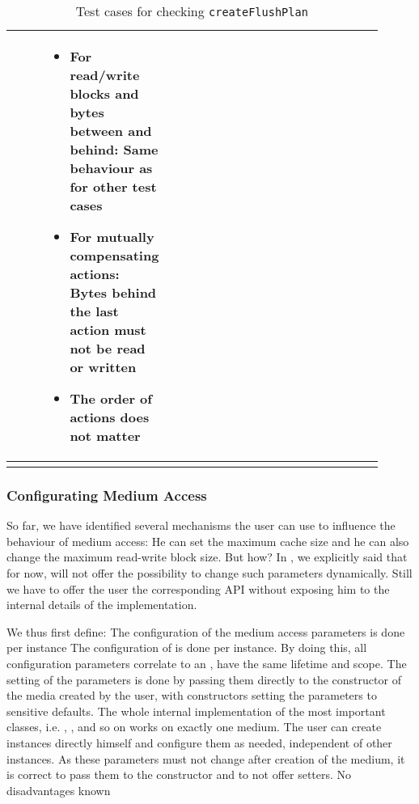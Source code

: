 \begin{landscape}
\begin{longtable}{|p{0.03\linewidth}|p{0.08\linewidth}|p{0.45\linewidth}|p{0.35\linewidth}|}
\begin{enumerate}
\end{enumerate}
&
\begin{itemize}
\item For read/write blocks and bytes between and behind: Same behaviour as for other test cases
\item For mutually compensating actions: Bytes behind the last action must not be read or written
\item The order of actions does not matter
\end{itemize}\\
\hline
\caption{Test cases for checking \texttt{createFlushPlan}}
\label{tab:createFlushPlan}
\end{longtable}
\end{landscape}

\subsubsection{Configurating Medium Access}%
\label{sec:Konfigurationsparameter}%

So far, we have identified several mechanisms the user can use to influence the behaviour of medium access: He can set the maximum cache size and he can also change the maximum read-write block size. But how? In , we explicitly said that for now, \LibName{} will not offer the possibility to change such parameters dynamically. Still we have to offer the user the corresponding API without exposing him to the internal details of the implementation.

We thus first define:
{%
The configuration of the medium access parameters is done per \IMedium{} instance
}
{%
The configuration of \COMPmedia{} is done per \IMedium{} instance. By doing this, all configuration parameters correlate to an \IMedium{}, have the same lifetime and scope. The setting of the parameters is done by passing them directly to the constructor of the media created by the user, with constructors setting the parameters to sensitive defaults.
}
{%
The whole internal implementation of the most important classes, i.e. \IMediumStore{}, \IMediumAccessor{}, \MediumCache{} and so on works on exactly one medium. The user can create \IMedium{} instances directly himself and configure them as needed, independent of other \IMedium{} instances. As these parameters must not change after creation of the medium, it is correct to pass them to the constructor and to not offer setters.
}
{%
No disadvantages known
}

